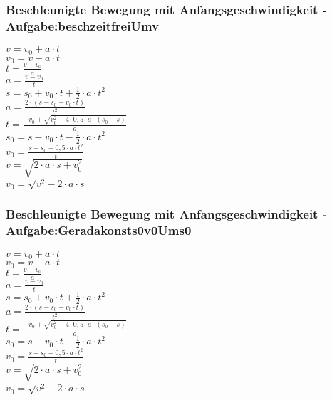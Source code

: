 \subsubsection{Beschleunigte Bewegung mit Anfangsgeschwindigkeit - Aufgabe:beschzeitfreiUmv} 
\begin{minipage}{0.45\textwidth} 
$ v = v_{0}  + a\cdot t $\\ 
$ v_{0}  = v - a\cdot t $\\ 
$ t = \frac{v - v_{0} }{a} $\\ 
$ a = \frac{v - v_{0} }{  t} $\\ 
$ s = s_{0}  + v_{0} \cdot t + \frac{1}{2}\cdot a\cdot t^{2} $\\ 
$ a = \frac{2\cdot (s - s_{0}  - v_{0} \cdot t)}{     t^{2} } $\\ 
$ t = \frac{-v_{0}  \pm \sqrt{v_{0} ^{2} -4\cdot 0,5\cdot a\cdot (s_{0}  -s)}}{       a} $\\ 
$ s_{0}  = s - v_{0} \cdot t - \frac{1}{2}\cdot a\cdot t^{2} $\\ 
$ v_{0}  =\frac{s-s_{0} -0,5\cdot a\cdot t^{2} }{    t} $\\ 
$ v  =\sqrt{2\cdot a \cdot s+ v_{0}^2} $\\ 
$ v_{0}  =\sqrt{v^2-2\cdot a \cdot s} $\\ 
\end{minipage} 
\begin{minipage}{0.45\textwidth} 
 
\end{minipage} 
\subsubsection{Beschleunigte Bewegung mit Anfangsgeschwindigkeit - Aufgabe:Geradakonsts0v0Ums0} 
\begin{minipage}{0.45\textwidth} 
$ v = v_{0}  + a\cdot t $\\ 
$ v_{0}  = v - a\cdot t $\\ 
$ t = \frac{v - v_{0} }{a} $\\ 
$ a = \frac{v - v_{0} }{  t} $\\ 
$ s = s_{0}  + v_{0} \cdot t + \frac{1}{2}\cdot a\cdot t^{2} $\\ 
$ a = \frac{2\cdot (s - s_{0}  - v_{0} \cdot t)}{     t^{2} } $\\ 
$ t = \frac{-v_{0}  \pm \sqrt{v_{0} ^{2} -4\cdot 0,5\cdot a\cdot (s_{0}  -s)}}{       a} $\\ 
$ s_{0}  = s - v_{0} \cdot t - \frac{1}{2}\cdot a\cdot t^{2} $\\ 
$ v_{0}  =\frac{s-s_{0} -0,5\cdot a\cdot t^{2} }{    t} $\\ 
$ v  =\sqrt{2\cdot a \cdot s+ v_{0}^2} $\\ 
$ v_{0}  =\sqrt{v^2-2\cdot a \cdot s} $\\ 
\end{minipage} 
\begin{minipage}{0.45\textwidth} 
 
\end{minipage} 

